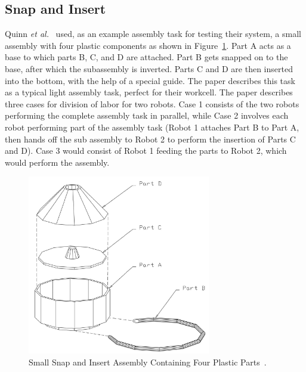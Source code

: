 \subsection{Snap and Insert}
Quinn \textit{et al.}~\cite{QUINN.1997} used, as an example assembly task for testing their system, a small assembly with four plastic components as shown in Figure~\ref{fig:Tony3}. Part A acts as a base to which parts B, C, and D are attached. Part B gets snapped on to the base, after which the subassembly is inverted. Parts C and D are then inserted into the bottom, with the help of a special guide.  The paper describes this task as a typical light assembly task, perfect for their workcell. The paper describes three cases for division of labor for two robots. Case 1 consists of the two robots performing the complete assembly task in parallel, while Case 2 involves each robot performing part of the assembly task (Robot 1 attaches Part B to Part A, then hands off the sub assembly to Robot 2 to perform the insertion of Parts C and D). Case 3 would consist of Robot 1 feeding the parts to Robot 2, which would perform the assembly.
\begin{figure}[!htb]
\centering
\includegraphics[width=8cm]{Figures/Tony-Fig3.jpg}
\caption{Small Snap and Insert Assembly Containing Four Plastic Parts~\cite{QUINN.1997}.}
\label{fig:Tony3}
\end{figure}

